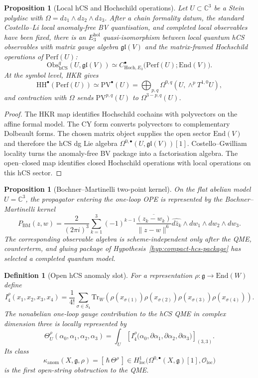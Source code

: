 \documentclass[11pt]{article}
\newtheorem{proposition}[theorem]{Proposition}
\newtheorem{definition}[theorem]{Definition}
\providecommand{\HH}{\mathrm{HH}}
\providecommand{\Obs}{\mathrm{Obs}}
\providecommand{\hCS}{\mathrm{hCS}}
\providecommand{\Perf}{\mathrm{Perf}}
\providecommand{\bC}{\mathbb{C}}
\providecommand{\cO}{\mathcal{O}}
\providecommand{\fgl}{\mathfrak{gl}}
\providecommand{\fg}{\mathfrak{g}}
\providecommand{\PV}{\mathrm{PV}}
\providecommand{\kanom}{\kappa_{\mathrm{anom}}}
\begin{document}
\begin{proposition}[Local hCS and Hochschild operations]
\label{prop:local-hcs-hoch}
Let $U\subset\bC^3$ be a Stein polydisc with
$\Omega=dz_1\wedge dz_2\wedge dz_3$.  After a chain formality datum, the
standard Costello--Li local anomaly-free BV quantisation, and completed
local observables have been fixed, there is an $E_3^{\mathrm{hol}}$
quasi-isomorphism between local quantum hCS observables with matrix
gauge algebra $\fgl(V)$ and the matrix-framed Hochschild operations of
$\Perf(U)$:
\[
 \Obs_{\hCS}^q(U,\fgl(V))
 \simeq
 C^\bullet_{\mathrm{Hoch},E_3}\bigl(\Perf(U);\mathrm{End}(V)\bigr).
\]
At the symbol level, HKR gives
\[
 \HH^\bullet(\Perf(U))
 \simeq
 \PV^\bullet(U)
 =
 \bigoplus_{p,q}\Omega^{0,q}(U,\wedge^pT^{1,0}U),
\]
and contraction with $\Omega$ sends $\PV^{p,q}(U)$ to
$\Omega^{3-p,q}(U)$.
\end{proposition}

\begin{proof}
The HKR map identifies Hochschild cochains with polyvectors on the
affine formal model.  The CY form converts polyvectors to complementary
Dolbeault forms.  The chosen matrix object supplies the open sector
$\mathrm{End}(V)$ and therefore the hCS dg Lie algebra
$\Omega^{0,\bullet}(U,\fgl(V))[1]$.  Costello--Gwilliam locality turns
the anomaly-free BV package into a factorisation algebra.  The
open--closed map identifies closed Hochschild operations with local
operations on this hCS sector.
\end{proof}

\begin{proposition}[Bochner--Martinelli two-point kernel]
\label{prop:bm-kernel}
On the flat abelian model $U=\bC^3$, the propagator entering the
one-loop OPE is represented by the Bochner--Martinelli kernel
\[
 P_{\mathrm{BM}}(z,w)
 =
 \frac{2}{(2\pi i)^3}
 \sum_{k=1}^{3}(-1)^{k-1}
 \frac{\overline{(z_k-w_k)}}{\|z-w\|^6}
 \widehat{d\bar z_k}\wedge dw_1\wedge dw_2\wedge dw_3 .
\]
The corresponding observable algebra is scheme-independent only after
the QME, counterterm, and gluing package of
Hypothesis~\ref{hyp:compact-hcs-package} has selected a completed
quantum model.
\end{proposition}

\begin{definition}[Open hCS anomaly slot]
\label{def:hcs-anomaly-slot}
For a representation $\rho\colon\fg\to\mathrm{End}(W)$ define
\[
 I_4^\rho(x_1,x_2,x_3,x_4)
 =
 \frac1{4!}\sum_{\sigma\in S_4}
 \mathrm{Tr}_W\!\left(
  \rho(x_{\sigma(1)})\rho(x_{\sigma(2)})
  \rho(x_{\sigma(3)})\rho(x_{\sigma(4)})
 \right).
\]
The nonabelian one-loop gauge contribution to the hCS QME in complex
dimension three is locally represented by
\[
 \Theta^\rho_U(\alpha_0,\alpha_1,\alpha_2,\alpha_3)
 =
 \int_U
 \left[
 I_4^\rho
  \bigl(\alpha_0,\partial\alpha_1,\partial\alpha_2,\partial\alpha_3\bigr)
 \right]_{(3,3)}.
\]
Its class
\[
 \kanom(X,\fg,\rho)
 =
 [\,\hbar\,\Theta^\rho\,]
 \in
 H^1_{\mathrm{loc}}
 \bigl(\Omega^{0,\bullet}(X,\fg)[1],\cO_{\mathrm{loc}}\bigr)
\]
is the first open-string obstruction to the QME.
\end{definition}
\end{document}
